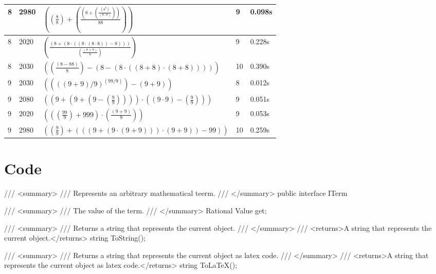 \documentclass{article}
\theoremstyle{nonumberplain}
\begin{document}
\begin{center}
\begin{longtable}{ | l | l | p{9.5cm} | l | l | }
        8 & 2980 & \( \left(\left(\frac{8}{8}\right) + \left(\frac{\left(8 + \left(\frac{\left({8}^{8}\right)}{\left(8 \cdot 8\right)}\right)\right)}{88}\right)\right) \) & 9 & 0.098s \\\hline
        8 & 2020 & \( \left(\frac{\left(8 + \left(8 \cdot \left(\left(8 \cdot \left(8 \cdot 8\right)\right) - 8\right)\right)\right)}{\left(\frac{\left(8 + 8\right)}{8}\right)}\right) \) & 9 & 0.228s \\\hline
        8 & 2030 & \( \left(\left(\frac{\left(8 - 88\right)}{8}\right) - \left(8 - \left(8 \cdot \left(\left(8 + 8\right) \cdot \left(8 + 8\right)\right)\right)\right)\right) \) & 10 & 0.390s \\\hline
        9 & 2030 & \( \left(\left({((9 + 9) / 9)}^{(99 / 9)}\right) - \left(9 + 9\right)\right) \) & 8 & 0.012s \\\hline
        9 & 2080 & \( \left(\left(9 + \left(9 + \left(9 - \left(\frac{9}{9}\right)\right)\right)\right) \cdot \left(\left(9 \cdot 9\right) - \left(\frac{9}{9}\right)\right)\right) \) & 9 & 0.051s \\\hline
        9 & 2020 & \( \left(\left(\left(\frac{99}{9}\right) + 999\right) \cdot \left(\frac{\left(9 + 9\right)}{9}\right)\right) \) & 9 & 0.053s \\\hline
        9 & 2980 & \( \left(\left(\frac{9}{9}\right) + \left(\left(\left(9 + \left(9 \cdot \left(9 + 9\right)\right)\right) \cdot \left(9 + 9\right)\right) - 99\right)\right) \) & 10 & 0.259s \\\hline
\end{longtable}
\end{center}

\section{Code}

\begin{lstcs}[]
/// <summary>
/// Represents an arbitrary mathematical teerm.
/// </summary>
public interface ITerm
{
    /// <summary>
    /// The value of the term.
    /// </summary>
    Rational Value { get; }

    /// <summary>
    /// Returns a string that represents the current object.
    /// </summary>
    /// <returns>A string that represents the current object.</returns>
    string ToString();

    /// <summary>
    /// Returns a string that represents the current object as latex code.
    /// </summary>
    /// <returns>A string that represents the current object as latex code.</returns>
    string ToLaTeX();
}
\end{lstcs}
\end{document}
